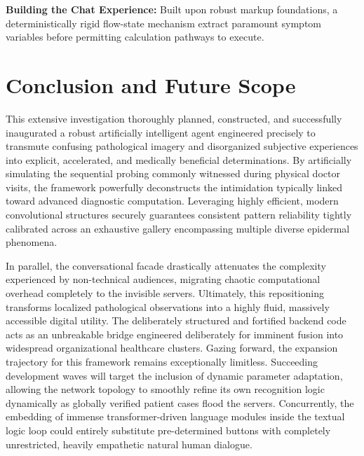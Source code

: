 \documentclass[conference]{IEEEtran}
\begin{document}
\textbf{Building the Chat Experience:} Built upon robust markup foundations, a deterministically rigid flow-state mechanism extract paramount symptom variables before permitting calculation pathways to execute.

\section{Conclusion and Future Scope}
This extensive investigation thoroughly planned, constructed, and successfully inaugurated a robust artificially intelligent agent engineered precisely to transmute confusing pathological imagery and disorganized subjective experiences into explicit, accelerated, and medically beneficial determinations. By artificially simulating the sequential probing commonly witnessed during physical doctor visits, the framework powerfully deconstructs the intimidation typically linked toward advanced diagnostic computation. Leveraging highly efficient, modern convolutional structures securely guarantees consistent pattern reliability tightly calibrated across an exhaustive gallery encompassing multiple diverse epidermal phenomena.

In parallel, the conversational facade drastically attenuates the complexity experienced by non-technical audiences, migrating chaotic computational overhead completely to the invisible servers. Ultimately, this repositioning transforms localized pathological observations into a highly fluid, massively accessible digital utility. The deliberately structured and fortified backend code acts as an unbreakable bridge engineered deliberately for imminent fusion into widespread organizational healthcare clusters. Gazing forward, the expansion trajectory for this framework remains exceptionally limitless. Succeeding development waves will target the inclusion of dynamic parameter adaptation, allowing the network topology to smoothly refine its own recognition logic dynamically as globally verified patient cases flood the servers. Concurrently, the embedding of immense transformer-driven language modules inside the textual logic loop could entirely substitute pre-determined buttons with completely unrestricted, heavily empathetic natural human dialogue.
\end{document}
